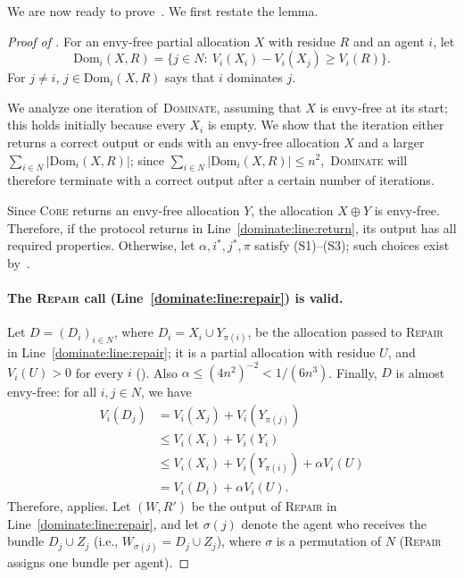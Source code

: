 \documentclass[11pt]{article}
\newcommand{\Core}{\textsc{Core}}
\newcommand{\Repair}{\textsc{Repair}}
\newcommand{\Dominate}{\textsc{Dominate}}
\newcommand{\Dom}{\mathrm{Dom}}
\theoremstyle{plain}
\theoremstyle{definition}
\theoremstyle{plain}
\begin{document}
We are now ready to prove~. We first restate the lemma.

\dominatemain*

\begin{proof}[Proof of ]
For an envy-free partial allocation $X$ with residue $R$ and an agent $i$, let
\[
\Dom_i(X,R)=\{j \in N:\ V_i(X_i)-V_i(X_j)\ge V_i(R)\}.
\]
For $j\ne i$, $j\in\Dom_i(X,R)$ says that $i$ dominates $j$.

We analyze one iteration of~\Dominate{}, assuming that $X$ is envy-free at its start; this holds initially because every $X_i$ is empty. We show that the iteration either returns a correct output or ends with an envy-free allocation $X$ and a larger $\sum_{i\in N}|\Dom_i(X,R) |$; since $\sum_{i\in N}|\Dom_i(X,R) | \leq n^2$,~\Dominate{} will therefore terminate with a correct output after a certain number of iterations.

Since \Core{} returns an envy-free allocation $Y$, the allocation $X\oplus Y$ is envy-free. Therefore, if the protocol returns in Line~\ref{dominate:line:return}, its output has all required properties. Otherwise, let $\alpha,i^*,j^*,\pi$ satisfy (S1)--(S3); such choices exist by~.

\paragraph{The \Repair{} call (Line~\ref{dominate:line:repair}) is valid.}
Let $D=(D_i)_{i \in N}$, where $D_i=X_i\cup Y_{\pi(i)}$, be the allocation passed to \Repair{} in Line~\ref{dominate:line:repair}; it is a partial allocation with residue $U$, and $V_i(U)>0$ for every $i$ (). Also $\alpha\le(4n^2)^{-2}<1/(6n^3)$. Finally, $D$ is almost envy-free: for all $i,j\in N$, we have
\begin{align*}
V_i(D_j) &=V_i(X_j)+V_i(Y_{\pi(j)}) \\
&\le V_i(X_i)+V_i(Y_i) \tag{$X$ and $Y$ are envy-free} \\
&\le V_i(X_i)+V_i(Y_{\pi(i)})+\alpha V_i(U) \tag{(S2) for agent $i$} \\
&=V_i(D_i)+\alpha V_i(U). 
\end{align*}
Therefore,  applies. Let $(W,R')$ be the output of \Repair{} in Line~\ref{dominate:line:repair}, and let $\sigma(j)$ denote the agent who receives the bundle $D_j\cup Z_j$ (i.e., $W_{\sigma(j)}=D_j\cup Z_j$), where $\sigma$ is a permutation of $N$ (\Repair{} assigns one bundle per agent).


\end{proof}
\end{document}
